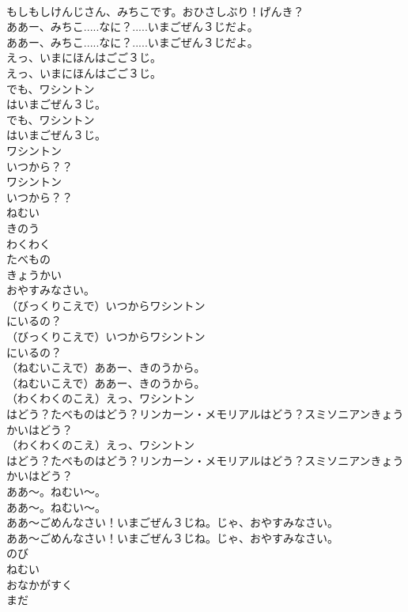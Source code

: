 \documentclass[8pt]{extreport}
\begin{document}
\begin{CJK}{UTF8}{min}
\\	もしもしけんじさん、みちこです。おひさしぶり！げんき？ 
\\	ああー、みちこ.....なに？.....いまごぜん３じだよ。	
\\	ああー、みちこ.....なに？.....いまごぜん３じだよ。 
\\	えっ、いまにほんはごご３じ。	
\\	えっ、いまにほんはごご３じ。 
\\	でも、ワシントン
\\	はいまごぜん３じ。	
\\	でも、ワシントン
\\	はいまごぜん３じ。 
\\	ワシントン
\\	いつから？？	
\\	ワシントン
\\	いつから？？　 
\\	ねむい
\\	きのう
\\	わくわく
\\	たべもの
\\	きょうかい
\\	おやすみなさい。
\\	（びっくりこえで）いつからワシントン
\\	にいるの？	
\\	（びっくりこえで）いつからワシントン
\\	にいるの？ 
\\	（ねむいこえで）ああー、きのうから。	
\\	（ねむいこえで）ああー、きのうから。 
\\	（わくわくのこえ）えっ、ワシントン
\\	はどう？たべものはどう？リンカーン・メモリアルはどう？スミソニアンきょうかいはどう？	
\\	（わくわくのこえ）えっ、ワシントン
\\	はどう？たべものはどう？リンカーン・メモリアルはどう？スミソニアンきょうかいはどう？ 
\\	ああ〜。ねむい〜。	
\\	ああ〜。ねむい〜。 
\\	ああ〜ごめんなさい！いまごぜん３じね。じゃ、おやすみなさい。	
\\	ああ〜ごめんなさい！いまごぜん３じね。じゃ、おやすみなさい。 
\\	のび
\\	ねむい
\\	おなかがすく
\\	まだ

\end{CJK}
\end{document}
